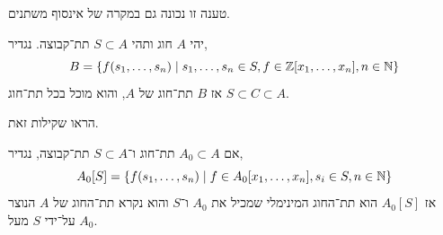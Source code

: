 \begin{remark}
	טענה זו נכונה גם במקרה של אינסוף משתנים.
\end{remark}
\begin{definition}
	יהי $A$ חוג ותהי $S \subset A$ תת־קבוצה.
	נגדיר,
	\[
		B
		= \{ f(s_1, \ldots, s_n) \mid s_1, \ldots, s_n \in S, f \in \mathbb{Z}[x_1, \ldots, x_n], n \in \mathbb{N} \}
	\]
	אז $B$ תת־חוג של $A$, והוא מוכל בכל תת־חוג $S \subset C \subset A$.
\end{definition}
\begin{exercise}
	הראו שקילות זאת.
\end{exercise}
\begin{definition}
	אם $A_0 \subset A$ תת־חוג ו־$S \subset A$ תת־קבוצה, נגדיר,
	\[
		A_0[S]
		= \{ f(s_1, \ldots, s_n) \mid f \in A_0[x_1, \ldots, x_n], s_i \in S, n \in \mathbb{N} \}
	\]
	אז $A_0[S]$ הוא תת־החוג המינימלי שמכיל את $A_0$ ו־$S$ והוא נקרא תת־החוג של $A$ הנוצר על־ידי $S$ מעל $A_0$.
\end{definition}

